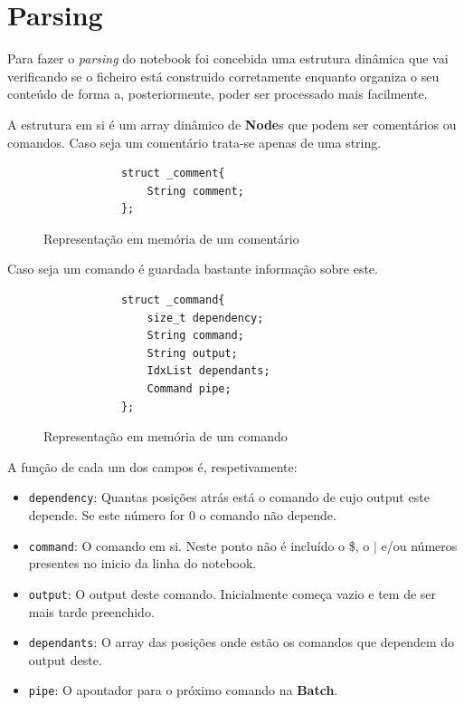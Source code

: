 \documentclass[12pt,a4paper]{report}
\begin{document}
\chapter{Parsing}
    Para fazer o \textit{parsing} do notebook foi concebida uma estrutura
    dinâmica que vai verificando se o ficheiro está construido corretamente
    enquanto organiza o seu conteúdo de forma a, posteriormente, poder ser
    processado mais facilmente.

    A estrutura em si é um array dinâmico de \textbf{Node}s que podem ser
    comentários ou comandos. Caso seja um comentário trata-se apenas de
    uma string.
    \begin{figure}[h]
        \centering
        \begin{verbatim}
            struct _comment{
                String comment;
            };
        \end{verbatim}
        \caption{Representação em memória de um comentário}
        \label{fig:commentStruct}
    \end{figure}

    Caso seja um comando é guardada bastante informação sobre este.
    \begin{figure}[h]
        \centering
        \begin{verbatim}
            struct _command{
                size_t dependency;
                String command;
                String output;
                IdxList dependants;
                Command pipe;
            };
        \end{verbatim}
        \caption{Representação em memória de um comando}
    \end{figure}

    A função de cada um dos campos é, respetivamente:
    \begin{itemize}
        \item \texttt{dependency}: Quantas posições atrás está o comando
            de cujo output este depende. Se este número for 0 o comando não
            depende.

        \item \texttt{command}: O comando em si. Neste ponto não é
            incluído o \$, o $|$ e/ou números presentes no inicio da linha
            do notebook.

        \item \texttt{output}: O output deste comando. Inicialmente
            começa vazio e tem de ser mais tarde preenchido.

        \item \texttt{dependants}: O array das posições onde estão os
            comandos que dependem do output deste.

        \item \texttt{pipe}: O apontador para o próximo comando na
            \textbf{Batch}.
    \end{itemize}
\end{document}
